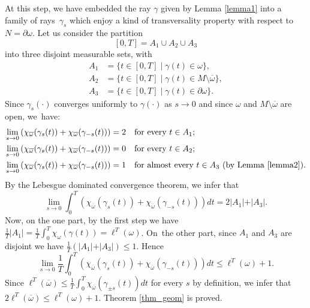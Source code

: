 \documentclass[JEP,XML,SOM,Unicode, NoEqCountersInSection,NoFloatCountersInSection,published]{cedram}
\theoremstyle{definition}
\begin{document}
At this step, we have embedded the ray $\gamma$ given by Lemma \ref{lemma1} into a family of rays~$\gamma_s$ which enjoy a kind of transversality property with respect to $N=\partial\omega$.
Let us consider the partition\vspace*{-3pt}
\[
[0,T] = A_1\cup A_2\cup A_3
\]
into three disjoint measurable sets, with
\begin{equation*}
\begin{split}
A_1 &= \{ t\in[0,T]\mid \gamma(t)\in\omega \},\\
A_2 &= \{ t\in[0,T]\mid \gamma(t)\in M\setminus\overline\omega \},\\
A_3 &= \{ t\in[0,T]\mid \gamma(t)\in\partial\omega \}.
\end{split}
\end{equation*}
Since $\gamma_s(\cdot)$ converges uniformly to $\gamma(\cdot)$ as $s\rightarrow 0$ and since $\omega$ and $M\setminus\overline\omega$ are open, we~have:\vspace*{-3pt}
\begin{align*}
\lim_{s\rightarrow 0} \left( \chi_{\overline\omega}(\gamma_s(t)) + \chi_{\overline\omega}(\gamma_{-s}(t)) \right) &= 2\quad\text{for every $t\in A_1$;}\\
\lim_{s\rightarrow 0} \left( \chi_{\overline\omega}(\gamma_s(t)) + \chi_{\overline\omega}(\gamma_{-s}(t)) \right) &= 0\quad\text{for every $t\in A_2$;}\\
\lim_{s\rightarrow 0} \left( \chi_{\overline\omega}(\gamma_s(t)) + \chi_{\overline\omega}(\gamma_{-s}(t)) \right) &= 1\quad\text{for almost every $t\in A_3$ (by Lemma \ref{lemma2}).}
\end{align*}
By the Lebesgue dominated convergence theorem, we infer that\vspace*{-3pt}
\[
\lim_{s\rightarrow 0} \int_0^T \left( \chi_{\overline\omega}(\gamma_s(t)) + \chi_{\overline\omega}(\gamma_{-s}(t)) \right) dt = 2\vert A_1\vert + \vert A_3\vert.
\]
Now, on the one part, by the first step we have $\frac{1}{T} \vert A_1\vert = \frac{1}{T} \int_0^T \chi_{\omega}(\gamma(t)) = \ell^T(\omega)$.
On~the other part, since $A_1$ and $A_3$ are disjoint we have $\frac{1}{T} ( \vert A_1\vert + \vert A_3\vert ) \leq 1$. Hence\vspace*{-3pt}
\[
\lim_{s\rightarrow 0} \frac{1}{T} \int_0^T \left( \chi_{\overline\omega}(\gamma_s(t)) + \chi_{\overline\omega}(\gamma_{-s}(t)) \right) dt \leq \ell^T(\omega)+1.
\]
Since $\ell^T(\overline\omega)\leq \frac{1}{T} \int_0^T \chi_{\overline\omega}(\gamma_{\pm s}(t)) dt$ for every $s$ by definition, we infer that $2 \ell^T(\overline\omega) \leq \ell^T(\omega)+1$. Theorem \ref{thm_geom} is proved.
\end{document}
